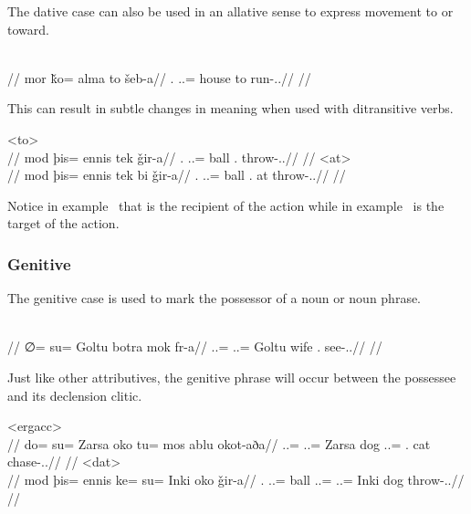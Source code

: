 The dative case can also be used in an allative sense to express movement to or toward.

	\begingl
		\glpreamble{}\\
		//
		\gla mor ǩo= alma to šeb-a//
		\glb \Fps.\An{} \In.\Sg.\Dat= house to run-\Ind.\Npst.\Ipfv//
		\glft{}//
	\endgl
\xe

This can result in subtle changes in meaning when used with ditransitive verbs.

	\a<to>\begingl
		\glpreamble{}\\
		//
		\gla mod þis= ennis tek ǧir-a//
		\glb \Fps.\Erg{} \In.\Pc.\Acc= ball \Sps.\Dat{}  throw-\Ind.\Npst.\Ipfv//
		\glft{}//
	\endgl
	\a<at>\begingl
		\glpreamble{}\\
		//
		\gla mod þis= ennis tek bi ǧir-a//
		\glb \Fps.\Erg{} \In.\Pc.\Acc= ball \Sps.\Dat{} at  throw-\Ind.\Npst.\Ipfv//
		\glft{}//
	\endgl
\xe

Notice in example~ that  is the recipient of the action while in example~  is the target of the action.

\subsubsection{Genitive}
\label{subsubsec:tvk-nouns-genitive}

The genitive case is used to mark the possessor of a noun or noun phrase.

	\begingl
		\glpreamble{}\\
		//
		\gla ∅= su= Goltu botra mok fr-a//
		\glb \An.\Sg.\Abs= \An.\Sg.\Gen= Goltu wife \Fps.\Dat{} see-\Ind.\Npst.\Ipfv//
		\glft{}//
	\endgl
\xe

Just like other attributives, the genitive phrase will occur between the possessee and its declension clitic.

	\a<ergacc>\begingl
		\glpreamble{}\\
		//
		\gla do= su= Zarsa oko tu= mos ablu okot-aða//
		\glb \An.\Sg.\Erg= \An.\Sg.\Gen= Zarsa dog \An.\Sg.\Acc= \Fps.\Gen{} cat chase-\Ind.\Pst.\Prg//
		\glft{}//
	\endgl
	\a<dat>\begingl
		\glpreamble{}\\
		//
		\gla mod þis= ennis ke= su= Inki oko ǧir-a//
		\glb \Fps.\Erg{} \In.\Sg.\Acc= ball \An.\Sg.\Dat= \An.\Sg.\Gen= Inki dog throw-\Ind.\Npst.\Ipfv//
		\glft{}//
	\endgl
\xe

